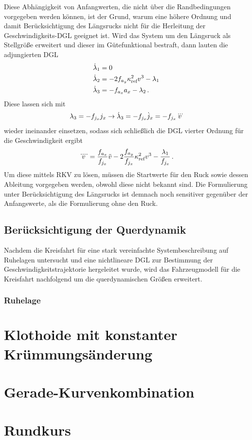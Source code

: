Diese Abhängigkeit von Anfangwerten, die nicht über die Randbedingungen vorgegeben werden können, ist der Grund, warum eine höhere Ordnung und damit Berücksichtigung des Längsrucks nicht für die Herleitung der Geschwindigkeits-\gls{DGL} geeignet ist. Wird das System um den Längsruck als Stellgröße erweitert und dieser im Gütefunktional bestraft, dann lauten die adjungierten \gls{DGL}
\begin{align}
\dot{\lambda}_1 &= 0 \\
\dot{\lambda}_2 &= -2f_{a_y} \kappa_{\textrm{ref}}^2v^3 - \lambda_1 \\
\dot{\lambda}_3 &= -f_{a_x} a_x - \lambda_2\,.
\end{align}
Diese lassen sich mit 
\begin{equation}
\lambda_3 = -f_{j_x} j_x \rightarrow \dot{\lambda}_3 = -f_{j_x} \dot{j}_x = -f_{j_x} \dddot{v}
\end{equation}
wieder ineinander einsetzen, sodass sich schließlich die \gls{DGL} vierter Ordnung für die Geschwindigkeit ergibt
\begin{equation}
\ddddot{v} = \frac{f_{a_x}}{f_{j_x}}\ddot{v} - 2\frac{f_{a_y}}{f_{j_x}}\kappa_{\textrm{ref}}^2v^3 - \frac{\lambda_1}{f_{j_x}}\,. \label{eq:DGL_v_Kreisfahrt_vierte_ordnung}
\end{equation}
Um diese mittels \gls{RKV} zu lösen, müssen die Startwerte für den Ruck sowie dessen Ableitung vorgegeben werden, obwohl diese nicht bekannt sind. Die Formulierung unter Berücksichtigung des Längsrucks ist demnach noch sensitiver gegenüber der Anfangswerte, als die Formulierung ohne den Ruck.

\subsection{Berücksichtigung der Querdynamik}
Nachdem die Kreisfahrt für eine stark vereinfachte Systembeschreibung auf Ruhelagen untersucht und eine nichtlineare \gls{DGL} zur Bestimmung der Geschwindigkeitstrajektorie hergeleitet wurde, wird das Fahrzeugmodell für die Kreisfahrt nachfolgend um die querdynamischen Größen erweitert.
\subsubsection{Ruhelage}
\section{Klothoide mit konstanter Krümmungsänderung}
\section{Gerade-Kurvenkombination}
\section{Rundkurs}
